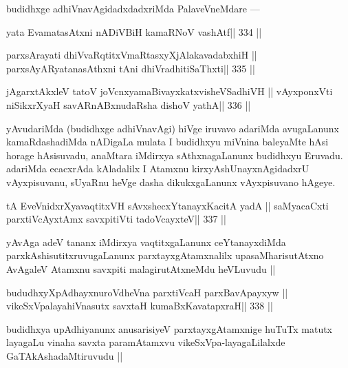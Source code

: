 \begin{artha}
budidhxge adhiVnavAgidadxdadxriMda PalaveVneMdare ---
\end{artha}

\begin{shl}
yata EvamatasAtxni nADiVBiH kamaRNoV vashAtf\hfill || 334 ||
\end{shl}

\begin{shl}
parxsArayati dhiVvaRqtitxVmaRtasxyXjAlakavadabxhiH ||
parxsAyAR\s\s yatanasAthxni tAni dhiVradhitiSaThxti\hfill || 335 ||
\end{shl}

\begin{shl}
jAgarxtAkxleV tatoV joVcnx\s yamaBivayxkatxvisheVSadhiVH ||
vAyxponxVti niSikxrXyaH savARnABxnudaRsha dishoV yathA\hfill || 336 ||
\end{shl}

\begin{artha}
yAvudariMda (budidhxge adhiVnavAgi) hiVge iruvavo adariMda avugaLanunx kamaRdashadiMda nADigaLa mulata I budidhxyu miVnina baleyaMte hAsi horage hAsisuvadu, anaMtara iMdirxya sAthxnagaLanunx budidhxyu Eruvadu. adariMda ecacxrAda kAladalilx I Atamxnu kirxyAshUnayxnAgidadxrU vAyxpisuvanu, sUyaRnu heVge dasha dikukxgaLanunx vAyxpisuvano hAgeye.
\end{artha}

\begin{shl}
tA EveVnidxrXyavaqtitxVH sAvxshecxYtanayxKacitA yadA ||
saMyacaCxti parxtiVcAyxtAmx savxpitiVti tadoVcayxteV\hfill || 337 ||
\end{shl}

\begin{artha}
yAvAga adeV tananx iMdirxya vaqtitxgaLanunx ceYtanayxdiMda parxkAshisutitxruvugaLanunx parxtayxgAtamxnalilx upasaMharisutAtxno AvAgaleV Atamxnu savxpiti malagirutAtxneMdu heVLuvudu ||
\end{artha}

\begin{shl}
bududhxyXpAdhayxnuroVdheVna parxtiVcaH parxBavApayxyw ||
vikeSxVpalayahiVnasutx savxtaH kumaBxKavatapxraH\hfill || 338 ||
\end{shl}

\begin{artha}
budidhxya upAdhiyanunx anusarisiyeV parxtayxgAtamxnige huTuTx matutx layagaLu vinaha savxta paramAtamxvu vikeSxVpa-layagaLilalxde GaTAkAshadaMtiruvudu ||
\end{artha}

